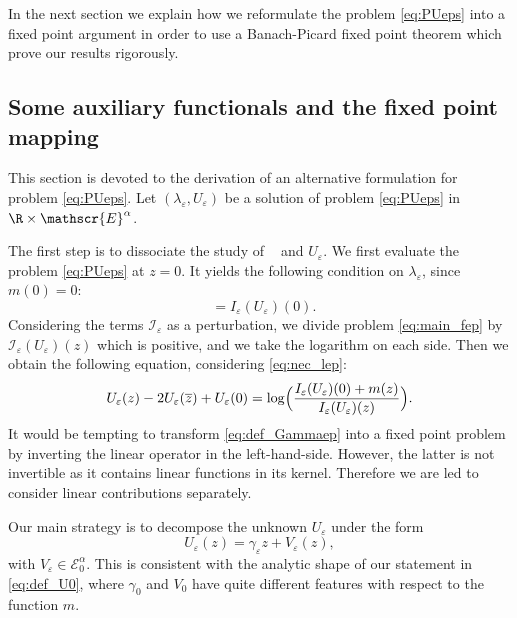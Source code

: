 \documentclass[JEP,XML,SOM,Unicode]{cedram}
\let\mathcal\mathscr
\newcommand{\cI}{\mathcal{I}}
\theoremstyle{plain}
\theoremstyle{definition}
\let\eps\varepsilon
\newcommand{\Ea}{\mathcal{E}^\alpha}
\newcommand{\Eaz}{\mathcal{E}^\alpha_0}
\newcommand{\bz}{\overline{z}}
\DeclareMathOperator{\lep}{\lambda_\varepsilon}
\newcommand{\iep}[1]{I_\varepsilon (U_\varepsilon)(#1)}
\begin{document}
In the next section we explain how we reformulate the problem \eqref{eq:PUeps} into a fixed point argument in order to use a Banach-Picard fixed point theorem which prove our results rigorously.
\subsection{Some auxiliary functionals and the fixed point mapping}\label{eq:formal equivalence}
This section is devoted to the derivation of an alternative formulation for problem \eqref{eq:PUeps}.
Let $(\lambda_\eps, U_\eps)$ be a solution of problem \eqref{eq:PUeps} in $\R \times \Ea $.

The first step is to dissociate the study of $\lep$ and $U_\eps$. We first evaluate the problem \eqref{eq:PUeps} at $z=0$. It yields the following condition on $\lambda_\eps$, since $m(0)=0$:
\begin{equation}\label{eq:nec_lep}
\lep = \iep{0}.
\end{equation}
Considering the terms $\cI_\eps$ as a perturbation, we divide problem \eqref{eq:main_fep} by $\cI_\eps(U_\eps)(z)$ which is positive, and we take the logarithm on each side. Then we obtain the following equation, considering \eqref{eq:nec_lep}:
\begin{equation}\label{eq:def_Gammaep}
U_\eps(z)-2U_\eps(\bz)+U_\eps(0) = \log \Bigl(\dfrac{\iep{0}+ m(z)}{\iep{z}} \Bigr).
\end{equation}
It would be tempting to transform \eqref{eq:def_Gammaep} into a fixed point problem by inverting the linear operator in the left-hand-side. However, the latter is not invertible as it contains linear functions in its kernel. Therefore we are led to consider linear contributions separately.

Our main strategy is to decompose the unknown $U_\eps$ under the form
\begin{equation}\label{eq:necshape Ueps}
U_\eps (z) = \gamma_\eps z + V_\eps(z),
\end{equation}
with $V_\eps \in \Eaz$. This is consistent with the analytic shape of our statement in \eqref{eq:def_U0}, where $\gamma_0$ and $V_0$ have quite different features with respect to the function $m$.
\end{document}

